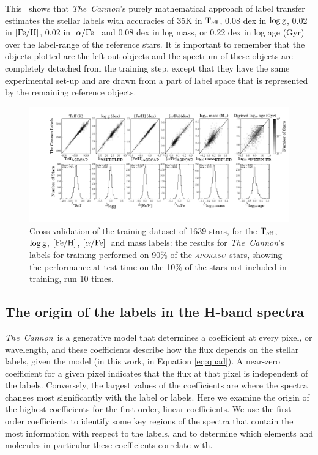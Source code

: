 \documentclass[12pt, preprint]{aastex}
\newcommand{\project}[1]{\textsl{#1}}
\newcommand{\tc}{\project{The~Cannon}}
\newcommand{\apokasc}{\project{\textsc{apokasc}}}
\newcommand{\teff}{\mbox{$\rm T_{eff}$}}
\newcommand{\feh}{\mbox{$\rm [Fe/H]$}}
\newcommand{\alphafe}{\mbox{$\rm [\alpha/Fe]$}}
\newcommand{\logg}{\mbox{$\rm \log g$}}
\begin{document}
This \figurename\ shows that \tc 's purely mathematical approach of label transfer estimates the stellar labels with accuracies of 35K in \teff, 0.08 dex in \logg, 0.02 in \feh, 0.02 in \alphafe\ and  0.08 dex in log mass, or 0.22 dex in log age (Gyr) over the label-range of the reference stars. It is important to remember that the objects plotted are the left-out objects and the spectrum of these objects are completely detached from the training step,  except that they have the same experimental set-up and are drawn from a part of label space that is represented by the remaining reference objects.

\begin{figure}[p]
\centering
        \includegraphics[scale=0.4]{./plots/validation_1639_6_quad.pdf}
  \caption{Cross validation of the training dataset of 1639 stars, for the \teff, \logg, \feh, \alphafe\ and mass labels: the results for \tc's labels for training performed on 90\% of the \apokasc\ stars, showing the performance at test time on the 10\% of the stars not included in training, run 10 times.}
\label{fig:validation1}
\end{figure}

\subsection{The origin of the labels in the H-band spectra}

\tc\ is a generative model that determines a coefficient at every pixel, or wavelength, and these coefficients describe how the flux depends on the stellar labels, given the model (in this work, in Equation \ref{eq:quad}).   A near-zero coefficient for a given pixel indicates that the flux at that pixel is independent of the labels. Conversely, the largest values of the coefficients are where the spectra changes most significantly with the label or labels. Here we examine the origin of the highest coefficients for the first order, linear coefficients. We use the first order coefficients to identify some key regions of the spectra that contain the most information with respect to the labels, and to determine which elements and molecules in particular these coefficients correlate with. 
\end{document}
